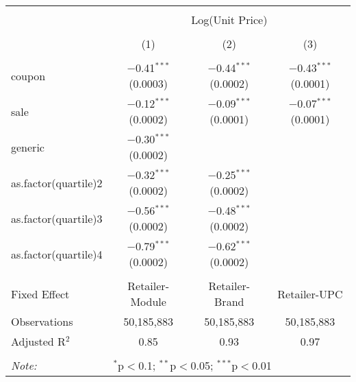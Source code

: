 
\begin{table}[!htbp] \centering 
  \caption{} 
  \label{tab:overallSavings} 
\begin{tabular}{@{\extracolsep{5pt}}lccc} 
\\[-1.8ex]\hline 
\hline \\[-1.8ex] 
 & \multicolumn{3}{c}{Log(Unit Price)} \\ 
\\[-1.8ex] & (1) & (2) & (3)\\ 
\hline \\[-1.8ex] 
 coupon & $-$0.41$^{***}$ (0.0003) & $-$0.44$^{***}$ (0.0002) & $-$0.43$^{***}$ (0.0001) \\ 
  sale & $-$0.12$^{***}$ (0.0002) & $-$0.09$^{***}$ (0.0001) & $-$0.07$^{***}$ (0.0001) \\ 
  generic & $-$0.30$^{***}$ (0.0002) &  &  \\ 
  as.factor(quartile)2 & $-$0.32$^{***}$ (0.0002) & $-$0.25$^{***}$ (0.0002) &  \\ 
  as.factor(quartile)3 & $-$0.56$^{***}$ (0.0002) & $-$0.48$^{***}$ (0.0002) &  \\ 
  as.factor(quartile)4 & $-$0.79$^{***}$ (0.0002) & $-$0.62$^{***}$ (0.0002) &  \\ 
 \hline \\[-1.8ex] 
Fixed Effect & Retailer-Module & Retailer-Brand & Retailer-UPC \\ 
Observations & 50,185,883 & 50,185,883 & 50,185,883 \\ 
Adjusted R$^{2}$ & 0.85 & 0.93 & 0.97 \\ 
\hline 
\hline \\[-1.8ex] 
\textit{Note:}  & \multicolumn{3}{l}{$^{*}$p$<$0.1; $^{**}$p$<$0.05; $^{***}$p$<$0.01} \\ 
\end{tabular} 
\end{table} 
